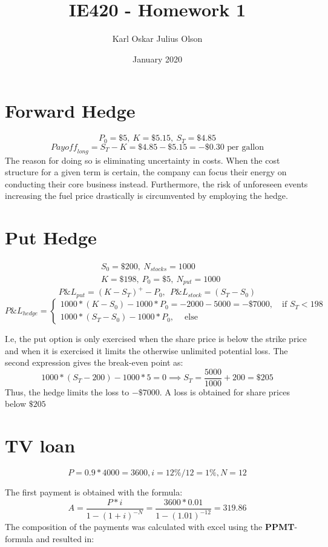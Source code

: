 \documentclass{article}
\title{IE420 - Homework 1}
\author{Karl Oskar Julius Olson}
\date{January 2020}
\begin{document}
\thispagestyle{fancy}


\section{Forward Hedge}

$$ P_0 = \$5, \  K = \$5.15, \ S_T = \$ 4.85$$
$${Payoff}_{long} = S_T - K = \$4.85 - \$5.15 = -\$0.30 \text{ per gallon} $$
The reason for doing so is eliminating uncertainty in costs. When the cost structure for a given term is certain, the company can focus their energy on conducting their core business instead. Furthermore, the risk of unforeseen events increasing the fuel price drastically is circumvented by employing the hedge. 

\section{Put Hedge}
\begin{align*}
	&S_0 = \$200, \ N_{stocks} = 1000 \\
	&K = \$198, \ P_0 = \$5, \ N_{put} = 1000
\end{align*}
$$P\&L_{put} = (K-S_T)^+ - P_0, \ \ P\&L_{stock} = (S_T - S_0)$$
$$P\&L_{hedge} = \begin{cases} 1000 * (K - S_0) - 1000 * P_0 = -2000 - 5000 = -\$7000, \ \ \ \text{ if $S_T < 198$ } \\ 1000*(S_T - S_0) - 1000*P_0, \ \ \ \   \text{ else} \end{cases} $$

I.e, the put option is only exercised when the share price is below the strike price and when it is exercised it limits the otherwise unlimited potential loss. The second expression gives the break-even point as:
$$1000 * (S_T- 200)-1000 * 5 = 0 \implies S_T = \frac{5000}{1000} + 200 = \$205$$
Thus, the hedge limits the loss to $-\$7000$. A loss is obtained for share prices below $\$205$


\section{TV loan}

$$P = 0.9 * 4000 = 3600, i = 12\% / 12 = 1\%, N = 12$$

The first payment is obtained with the formula: 
$$A = \frac{P*i}{1-(1+i)^{-N}} = \frac{3600 * 0.01}{1-(1.01)^{-12}} = 319.86$$
The composition of the payments was calculated with excel using the \textbf{PPMT}-formula and resulted in:
\end{document}
